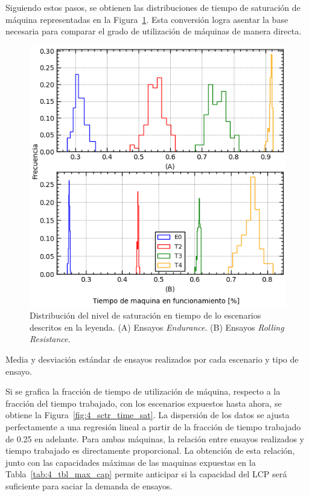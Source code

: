 Siguiendo estos pasos, se obtienen las distribuciones
de tiempo de saturación de máquina
representadas en la Figura~\ref{fig:4_hist_time_sat}.
Esta conversión logra asentar la base necesaria para
comparar el grado de utilización de máquinas de manera directa.

\begin{figure}
	\begin{center}
		\includegraphics{fig/4_hist_time_sat}
	\end{center}
	\caption{Distribución del nivel de saturación en tiempo de lo escenarios descritos en la leyenda.
	(A) Ensayos \textit{Endurance}. (B) Ensayos \textit{Rolling Resistance}.}
	\label{fig:4_hist_time_sat}
\end{figure}

\begin{table}
	\centering
	\caption{Media y desviación estándar de ensayos realizados por cada escenario y tipo de ensayo.}
	
	\label{tab:4_tbl_test_done}
\end{table}

Si se grafica la fracción de tiempo de utilización de máquina,
respecto a la fracción del tiempo trabajado,
con los escenarios expuestos hasta ahora,
se obtiene la Figura~\ref{fig:4_sctr_time_sat}.
La dispersión de los datos se ajusta perfectamente a una regresión lineal
a partir de la fracción de tiempo trabajado de 0.25 en adelante.
Para ambas máquinas, la relación entre ensayos realizados
y tiempo trabajado es directamente proporcional.
La obtención de esta relación,
junto con las capacidades máximas de las maquinas
expuestas en la Tabla~\ref{tab:4_tbl_max_cap} permite 
anticipar si la capacidad del LCP será suficiente
para saciar la demanda de ensayos.

